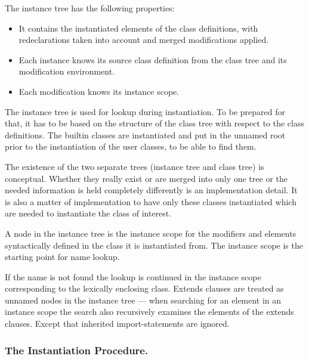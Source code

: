 The instance tree has the following properties:
\begin{itemize}
\item
  It contains the instantiated elements of the class definitions, with
  redeclarations taken into account and merged modifications applied.
\end{itemize}

\begin{itemize}
\item
  Each instance knows its source class definition from the class tree
  and its modification environment.
\item
  Each modification knows its instance scope.
\end{itemize}

The instance tree is used for lookup during instantiation. To be
prepared for that, it has to be based on the structure of the class tree
with respect to the class definitions. The builtin classes are
instantiated and put in the unnamed root prior to the instantiation of
the user classes, to be able to find them.

\begin{nonnormative}
The existence of the two separate trees (instance tree and
class tree) is conceptual. Whether they really exist or are merged into
only one tree or the needed information is held completely differently
is an implementation detail. It is also a matter of implementation to
have only these classes instantiated which are needed to instantiate the
class of interest.
\end{nonnormative}

A node in the instance tree is the instance scope for the modifiers and
elements syntactically defined in the class it is instantiated from. The
instance scope is the starting point for name lookup.

\begin{nonnormative}
If the name is not found the lookup is continued in the instance scope corresponding to the lexically enclosing class.  Extends clauses are treated as unnamed nodes in the
instance tree --- when searching for an element in an instance scope the search also recursively examines the elements of the extends clauses.  Except that inherited
import-statements are ignored.
\end{nonnormative}

\subsubsection{The Instantiation Procedure.}


